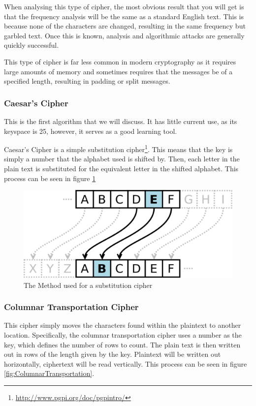 				When analysing this type of cipher, the most obvious result that you will get is that the frequency analysis will be the same as a standard English text.
				This is because none of the characters are changed, resulting in the same frequency but garbled text.
				Once this is known, analysis and algorithmic attacks are generally quickly successful.

				This type of cipher is far less common in modern cryptography as it requires large amounts of memory
				and sometimes requires that the messages be of a specified length, resulting in padding or split messages.
			\subsubsection{Caesar's Cipher}
				This is the first algorithm that we will discuss.
				It has little current use, as its keyspace is 25, however, it serves as a good learning tool.

				Caesar's Cipher is a simple substitution cipher\footnote{\url{http://www.pgpi.org/doc/pgpintro/}}.
				This means that the key is simply a number that the alphabet used is shifted by.
				Then, each letter in the plain text is substituted for the equivalent letter in the shifted alphabet.
				This process can be seen in figure \ref{fig:CaesarsCipher}
				\begin{figure}[htb]
					\centering
					\includegraphics[scale=0.25]{./CaesarsCipher.png}
					\caption{The Method used for a substitution cipher}
					\label{fig:CaesarsCipher}
				\end{figure}
			\subsubsection{Columnar Transportation Cipher}
				This cipher simply moves the characters found within the plaintext to another location.
				Specifically, the columnar transportation cipher uses a number as the key, which defines the number of rows to count.
				The plain text is then written out in rows of the length given by the key.
				Plaintext will be written out horizontally, ciphertext will be read vertically.
				This process can be seen in figure \ref{fig:ColumnarTransportation}.

